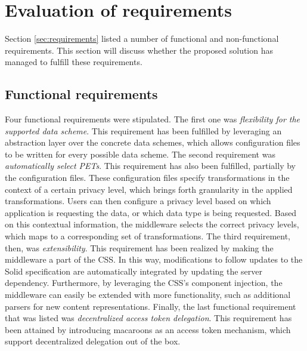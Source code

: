 \section{Evaluation of requirements}
Section \ref{sec:requirements} listed a number of functional and non-functional requirements. This section will discuss whether the proposed solution has managed to fulfill these requirements.

\subsection{Functional requirements}
Four functional requirements were stipulated. The first one was \textit{flexibility for the supported data scheme}. This requirement has been fulfilled by leveraging an abstraction layer over the concrete data schemes, which allows configuration files to be written for every possible data scheme. The second requirement was \textit{automatically select \gls{PETs}}. This requirement has also been fulfilled, partially by the configuration files. These configuration files specify transformations in the context of a certain privacy level, which brings forth granularity in the applied transformations. Users can then configure a privacy level based on which application is requesting the data, or which data type is being requested. Based on this contextual information, the middleware selects the correct privacy levels, which maps to a corresponding set of transformations. The third requirement, then, was \textit{extensibility}. This requirement has been realized by making the middleware a part of the \acrlong{CSS}. In this way, modifications to follow updates to the Solid specification are automatically integrated by updating the server dependency. Furthermore, by leveraging the \gls{CSS}'s component injection, the middleware can easily be extended with more functionality, such as additional parsers for new content representations. Finally, the last functional requirement that was listed was \textit{decentralized access token delegation}. This requirement has been attained by introducing macaroons as an access token mechanism, which support decentralized delegation out of the box.

